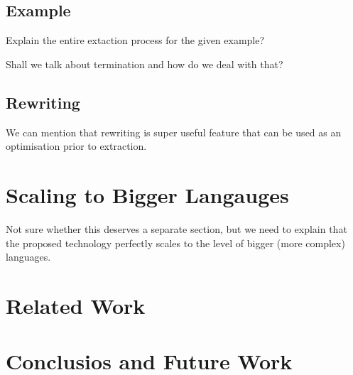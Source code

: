 \documentclass[sigplan,anonymous,review]{acmart}
\begin{document}
\subsection{Example}
Explain the entire extaction process for the given example?

Shall we talk about termination and how do we deal with that?


\subsection{\label{sec:rewriting}Rewriting}
We can mention that rewriting is super useful feature that can be used as an optimisation
prior to extraction.



\section{Scaling to Bigger Langauges}
Not sure whether this deserves a separate section, but we need to explain
that the proposed technology perfectly scales to the level of bigger (more complex)
languages.


\section{Related Work}

\section{Conclusios and Future Work}


\end{document}
